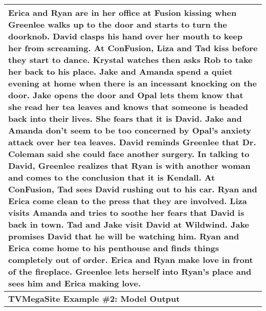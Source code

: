\documentclass{article} \usepackage{iclr2022_conference,times}
\begin{document}
\begin{table}[!htbp]
\begin{tabular}{p{\linewidth}}
Erica and Ryan are in her office at Fusion kissing when Greenlee walks up to the door and starts to turn the doorknob. David clasps his hand over her mouth to keep her from screaming. At ConFusion, Liza and Tad kiss before they start to dance. Krystal watches then asks Rob to take her back to his place. Jake and Amanda spend a quiet evening at home when there is an incessant knocking on the door. Jake opens the door and Opal lets them know that she read her tea leaves and knows that someone is headed back into their lives. She fears that it is David. Jake and Amanda don't seem to be too concerned by Opal's anxiety attack over her tea leaves. David reminds Greenlee that Dr. Coleman said she could face another surgery. In talking to David, Greenlee realizes that Ryan is with another woman and comes to the conclusion that it is Kendall. At ConFusion, Tad sees David rushing out to his car. Ryan and Erica come clean to the press that they are involved. Liza visits Amanda and tries to soothe her fears that David is back in town. Tad and Jake visit David at Wildwind. Jake promises David that he will be watching him. Ryan and Erica come home to his penthouse and finds things completely out of order. Erica and Ryan make love in front of the fireplace. Greenlee lets herself into Ryan's place and sees him and Erica making love.
    \\
    \midrule
    \textbf{TVMegaSite Example \#2: Model Output} \\
    \midrule

\end{tabular}
\end{table}
\end{document}
